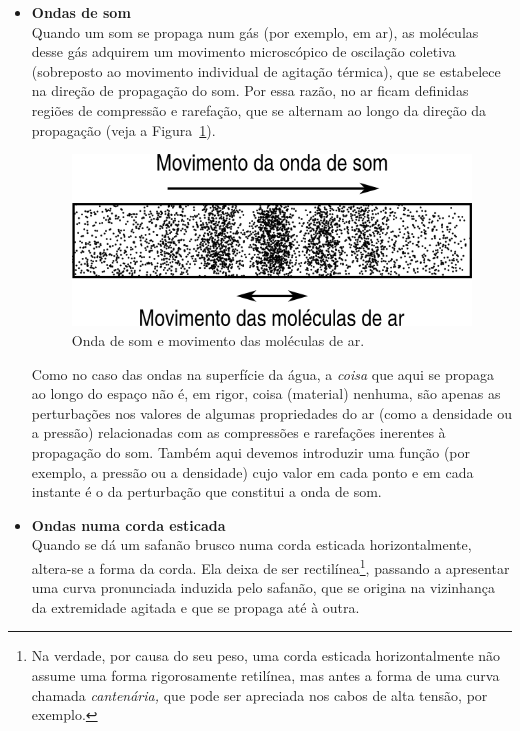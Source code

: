 \begin{itemize}
\item \textbf{Ondas de som}\\
    Quando um som se propaga num gás (por exemplo, em ar), as moléculas desse
    gás adquirem um movimento microscópico de oscilação coletiva (sobreposto ao
    movimento individual de agitação térmica), que se estabelece na direção de
    propagação do som. Por essa razão, no ar ficam definidas regiões de
    compressão e rarefação, que se alternam ao longo da direção da propagação
    (veja a Figura~\ref{fig:20-020}).
    \begin{figure}[htb]
        {\centering
            \includegraphics{figs/f20-020.png}
            \caption{Onda de som e movimento das moléculas de ar.%
                \label{fig:20-020}}

        }
    \end{figure}
    Como no caso das ondas na superfície da água, a \emph{coisa} que aqui se
    propaga ao longo do espaço não é, em rigor, coisa (material) nenhuma, são
    apenas as perturbações nos valores de algumas propriedades do ar (como a
    densidade ou a pressão) relacionadas com as compressões e rarefações
    inerentes à propagação do som. Também aqui devemos introduzir uma função
    (por exemplo, a pressão ou a densidade) cujo valor em cada ponto e em cada
    instante é o da perturbação que constitui a onda de som.

\item \textbf{Ondas numa corda esticada}\\
    Quando se dá um safanão brusco numa corda esticada horizontalmente,
    altera-se a forma da corda. Ela deixa de ser rectilínea\footnote{Na verdade,
    por causa do seu peso, uma corda esticada horizontalmente não assume uma
    forma rigorosamente retilínea, mas antes a forma de uma curva chamada
    \emph{cantenária,} que pode ser apreciada nos cabos de alta tensão, por
    exemplo.}, passando a apresentar uma curva pronunciada induzida pelo
    safanão, que se origina na vizinhança da extremidade agitada e que se
    propaga até à outra.


\end{itemize}
